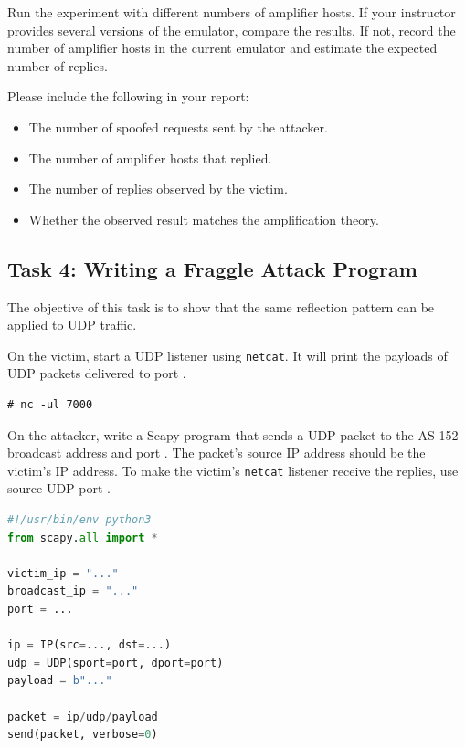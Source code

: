 Run the experiment with different numbers of amplifier hosts. If your instructor
provides several versions of the emulator, compare the results. If not, record
the number of amplifier hosts in the current emulator and estimate the expected
number of replies.

Please include the following in your report:

\begin{itemize}[noitemsep]
\item The number of spoofed requests sent by the attacker.
\item The number of amplifier hosts that replied.
\item The number of replies observed by the victim.
\item Whether the observed result matches the amplification theory.
\end{itemize}



\subsection{Task 4: Writing a Fraggle Attack Program}

The objective of this task is to show that the same reflection pattern can be
applied to UDP traffic.

On the victim, start a UDP listener using \texttt{netcat}. It will print the
payloads of UDP packets delivered to port \fraggleport.

\begin{lstlisting}
# nc -ul 7000
\end{lstlisting}

On the attacker, write a Scapy program that sends a UDP packet to the AS-152
broadcast address and port \fraggleport. The packet's source IP address should
be the victim's IP address. To make the victim's \texttt{netcat} listener
receive the replies, use source UDP port \fraggleport.

\begin{lstlisting}[language=python]
#!/usr/bin/env python3
from scapy.all import *

victim_ip = "..."
broadcast_ip = "..."
port = ...

ip = IP(src=..., dst=...)
udp = UDP(sport=port, dport=port)
payload = b"..."

packet = ip/udp/payload
send(packet, verbose=0)
\end{lstlisting}

